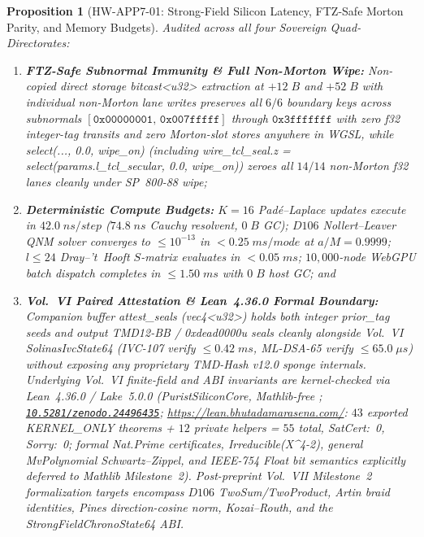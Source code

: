 \documentclass[11pt,a4paper,reqno]{article}
\def\texttt#1{#1}%
\def\mathrm#1{#1}%
\def\mathbb#1{#1}%
\def\textsc#1{#1}%
\def\Done{D106}%
\def\TMD{TMD-Hash v12.0}%
\theoremstyle{plain}
\newtheorem{proposition}[theorem]{Proposition}
\theoremstyle{definition}
\theoremstyle{remark}
\numberwithin{equation}{section}
\numberwithin{table}{section}
\newcommand{\Done}{\mathbb{D}_{106}}
\newcommand{\TMD}{{\normalfont\textsc{TMD-Hash v12.0}}}
\providecommand{\zenodo}[1]{\href{https://doi.org/10.5281/zenodo.#1}{\nolinkurl{10.5281/zenodo.#1}}}
\begin{document}
\begin{proposition}[{\texttt{HW-APP7-01}: Strong-Field Silicon Latency, FTZ-Safe Morton Parity, and Memory Budgets}]
\label{prop:hw_vol7}
Audited across all four Sovereign Quad-Directorates:
\begin{enumerate}[label=(\roman*), before=\raggedright]
  \item \textbf{FTZ-Safe Subnormal Immunity \& Full Non-Morton Wipe:} Non-copied direct storage \texttt{bitcast<u32>} extraction at $+12\;\mathrm{B}$ and $+52\;\mathrm{B}$ with individual non-Morton lane writes preserves all $6/6$ boundary keys across subnormals $[\mathtt{0x00000001},\,\mathtt{0x007fffff}]$ through $\mathtt{0x3fffffff}$ with zero \texttt{f32} integer-tag transits and zero Morton-slot stores anywhere in WGSL, while \texttt{select(..., 0.0, wipe\_on)} (including \texttt{wire\_tcl\_seal.z = select(\allowbreak params.l\_tcl\_secular, 0.0, wipe\_on)}) zeroes all $14/14$ non-Morton \texttt{f32} lanes cleanly under SP~800-88 wipe;
  \item \textbf{Deterministic Compute Budgets:} $K=16$ Pad\'e--Laplace updates execute in $42.0\;\mathrm{ns/step}$ ($74.8\;\mathrm{ns}$ Cauchy resolvent, $0\;\mathrm{B}$ GC); $\Done$ Nollert--Leaver QNM solver converges to $\le 10^{-13}$ in $< 0.25\;\mathrm{ms/mode}$ at $a/M=0.9999$; $l \le 24$ Dray--'t~Hooft $S$-matrix evaluates in $< 0.05\;\mathrm{ms}$; $10{,}000$-node WebGPU batch dispatch completes in $\le 1.50\;\mathrm{ms}$ with $0\;\mathrm{B}$ host GC; and
  \item \textbf{Vol.~VI Paired Attestation \& Lean~4.36.0 Formal Boundary:} Companion buffer \texttt{attest\_seals} (\texttt{vec4<u32>}) holds both integer \texttt{prior\_tag} seeds and output \texttt{TMD12-BB} / \texttt{0xdead0000u} seals cleanly alongside Vol.~VI \texttt{SolinasIvcState64} (\texttt{IVC-107} verify $\le 0.42\;\mathrm{ms}$, \texttt{ML-DSA-65} verify $\le 65.0\;\mu\mathrm{s}$) without exposing any proprietary \TMD{} sponge internals. Underlying Vol.~VI finite-field and ABI invariants are kernel-checked via Lean~4.36.0 / Lake~5.0.0 (\texttt{PuristSiliconCore}, Mathlib-free \cite{AppliedPuristVol6Lean2026}; \zenodo{24496435}; \url{https://lean.bhutadamarasena.com/}: $43$ exported \texttt{KERNEL\_ONLY} theorems + $12$ private helpers = $55$ total, \texttt{SatCert:~0}, \texttt{Sorry:~0}; formal \texttt{Nat.Prime} certificates, \texttt{Irreducible(X\^{}4-2)}, general \texttt{MvPolynomial} Schwartz--Zippel, and IEEE-754 \texttt{Float} bit semantics explicitly deferred to Mathlib Milestone~2). Post-preprint Vol.~VII Milestone~2 formalization targets encompass $\Done$ \texttt{TwoSum}/\texttt{TwoProduct}, Artin braid identities, Pines direction-cosine norm, Kozai--Routh, and the \texttt{StrongFieldChronoState64} ABI.
\end{enumerate}
\end{proposition}
\end{document}
